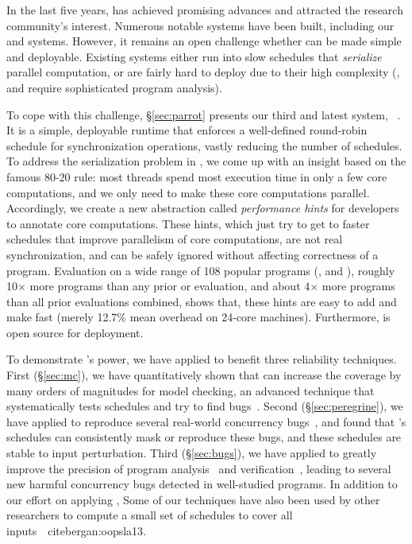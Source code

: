 In the last five
years, \smt has achieved promising advances and attracted the research
community's interest. Numerous notable \smt systems have been built, including
our \tern and 
\peregrine systems. However, it remains an open challenge whether
\smt can be made simple and deployable. Existing \smt systems either run into
slow schedules that
\emph{serialize} parallel computation, or are fairly hard to deploy
due to their high complexity (\eg, \tern and \peregrine require sophisticated
program analysis).

To cope with this challenge, \S\ref{sec:parrot} presents our third and latest
\smt system, 
\parrot~\cite{parrot:sosp13}. It is a simple, deployable runtime that enforces a
well-defined
round-robin schedule for synchronization operations, vastly reducing the number
of
schedules. To address the serialization problem in \smt,
we come up with an insight based on the famous 80-20 rule: most threads spend
most 
execution time in only a few core computations, and we only need to make 
these core computations parallel. Accordingly, we create a 
new abstraction called \emph{performance hints} for developers to 
annotate core computations. These hints, which just try to get to faster
schedules that improve 
parallelism of core computations, are not real 
synchronization, and can be safely ignored without affecting correctness of a 
program. Evaluation on a wide range of 108 popular programs (\eg, \bdb and
\mplayer),
roughly 10$\times$ more programs than any prior \smt or 
\dmt evaluation, and about 4$\times$ more programs than all prior evaluations
combined, 
shows that, these hints are easy to add and make \parrot fast
(merely 12.7\% mean overhead on 24-core machines). Furthermore, \parrot is open
source for deployment.

To demonstrate \smt's power, we have applied \smt to benefit three reliability
techniques. First (\S\ref{sec:mc}), we have quantitatively shown that \smt can
increase the coverage by many orders of magnitudes for model checking, an
advanced technique that systematically tests schedules and try to find
bugs~\cite{parrot:sosp13, dbug:spin11, modist:nsdi09}. Second
(\S\ref{sec:peregrine}), we have applied \smt to reproduce several real-world
concurrency bugs~\cite{cui:tern:osdi10}, and found that \smt's schedules can
consistently mask or reproduce these bugs, and these schedules are stable to
input perturbation. Third (\S\ref{sec:bugs}), we have applied \smt to greatly
improve the precision of program analysis~\cite{wu:pldi12} and
verification~\cite{wu:pldi12}, leading to several new harmful concurrency bugs
detected in well-studied programs. In addition to our effort on applying \smt,
Some of our \smt techniques have also been used by other researchers to compute
a small set of schedules to cover all inputs~\
cite{bergan:oopsla13}.

